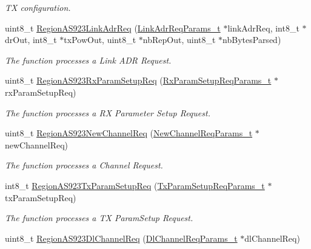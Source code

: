 \begin{DoxyCompactItemize}
\begin{DoxyCompactList}\small\item\em TX configuration. \end{DoxyCompactList}\item 
uint8\+\_\+t \mbox{\hyperlink{group___r_e_g_i_o_n_a_s923_ga154ccc00c27ca878e07cfeab3716523a}{Region\+A\+S923\+Link\+Adr\+Req}} (\mbox{\hyperlink{group___r_e_g_i_o_n_gad4af503e8d4de1846129e26a799a1e8e}{Link\+Adr\+Req\+Params\+\_\+t}} $\ast$link\+Adr\+Req, int8\+\_\+t $\ast$dr\+Out, int8\+\_\+t $\ast$tx\+Pow\+Out, uint8\+\_\+t $\ast$nb\+Rep\+Out, uint8\+\_\+t $\ast$nb\+Bytes\+Parsed)
\begin{DoxyCompactList}\small\item\em The function processes a Link A\+DR Request. \end{DoxyCompactList}\item 
uint8\+\_\+t \mbox{\hyperlink{group___r_e_g_i_o_n_a_s923_ga1cfa678c3c8157f7eb382d8fe9d9ba04}{Region\+A\+S923\+Rx\+Param\+Setup\+Req}} (\mbox{\hyperlink{group___r_e_g_i_o_n_ga7165f282c670c728c36d534df2285157}{Rx\+Param\+Setup\+Req\+Params\+\_\+t}} $\ast$rx\+Param\+Setup\+Req)
\begin{DoxyCompactList}\small\item\em The function processes a RX Parameter Setup Request. \end{DoxyCompactList}\item 
uint8\+\_\+t \mbox{\hyperlink{group___r_e_g_i_o_n_a_s923_gaad10b4ed09a71cdff0e385729e4dc345}{Region\+A\+S923\+New\+Channel\+Req}} (\mbox{\hyperlink{group___r_e_g_i_o_n_gae2abcdb6dbb843c9faf5fd3009eca9d6}{New\+Channel\+Req\+Params\+\_\+t}} $\ast$new\+Channel\+Req)
\begin{DoxyCompactList}\small\item\em The function processes a Channel Request. \end{DoxyCompactList}\item 
int8\+\_\+t \mbox{\hyperlink{group___r_e_g_i_o_n_a_s923_gab0fbb927f3521fd56696157e270043c1}{Region\+A\+S923\+Tx\+Param\+Setup\+Req}} (\mbox{\hyperlink{group___r_e_g_i_o_n_ga26836ef2996e70410e42ef471073f855}{Tx\+Param\+Setup\+Req\+Params\+\_\+t}} $\ast$tx\+Param\+Setup\+Req)
\begin{DoxyCompactList}\small\item\em The function processes a TX Param\+Setup Request. \end{DoxyCompactList}\item 
uint8\+\_\+t \mbox{\hyperlink{group___r_e_g_i_o_n_a_s923_ga3517054139f97c1b45454355fe661f48}{Region\+A\+S923\+Dl\+Channel\+Req}} (\mbox{\hyperlink{group___r_e_g_i_o_n_gae0d608ff1f8ea0a430e4f9a4c38ec7f3}{Dl\+Channel\+Req\+Params\+\_\+t}} $\ast$dl\+Channel\+Req)

\end{DoxyCompactItemize}

